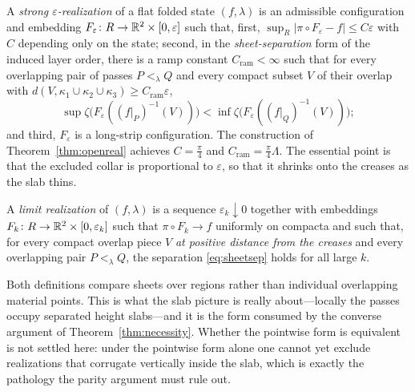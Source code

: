 \begin{definition}\label{def:strongreal}
A \emph{strong $\varepsilon$-realization} of a flat folded state $(f,\lambda)$ is an admissible configuration and embedding $F_\varepsilon\colon R\to\mathbb{R}^2\times[0,\varepsilon]$ such that, first, $\sup_R\lvert\pi\circ F_\varepsilon-f\rvert\le C\varepsilon$ with $C$ depending only on the state; second, in the \emph{sheet-separation} form of the induced layer order, there is a ramp constant $C_{\mathrm{ram}}<\infty$ such that for every overlapping pair of passes $P<_\lambda Q$ and every compact subset $V$ of their overlap with $d(V,\kappa_1\cup\kappa_2\cup\kappa_3)\ge C_{\mathrm{ram}}\varepsilon$,
\begin{equation}\label{eq:sheetsep}
  \sup\zeta\bigl(F_\varepsilon((f|_P)^{-1}(V))\bigr)<\inf\zeta\bigl(F_\varepsilon((f|_Q)^{-1}(V))\bigr);
\end{equation}
and third, $F_\varepsilon$ is a long-strip configuration. The construction of Theorem~\ref{thm:openreal} achieves $C=\frac\pi4$ and $C_{\mathrm{ram}}=\frac\pi4\Lambda$. The essential point is that the excluded collar is proportional to $\varepsilon$, so that it shrinks onto the creases as the slab thins.
\end{definition}

\begin{definition}\label{def:limitreal}
A \emph{limit realization} of $(f,\lambda)$ is a sequence $\varepsilon_k\downarrow0$ together with embeddings $F_k\colon R\to\mathbb{R}^2\times[0,\varepsilon_k]$ such that $\pi\circ F_k\to f$ uniformly on compacta and such that, for every compact overlap piece $V$ \emph{at positive distance from the creases} and every overlapping pair $P<_\lambda Q$, the separation \eqref{eq:sheetsep} holds for all large $k$.
\end{definition}

\begin{remark}\label{rem:sheetform}
Both definitions compare sheets over regions rather than individual overlapping material points. This is what the slab picture is really about---locally the passes occupy separated height slabs---and it is the form consumed by the converse argument of Theorem~\ref{thm:necessity}. Whether the pointwise form is equivalent is not settled here: under the pointwise form alone one cannot yet exclude realizations that corrugate vertically inside the slab, which is exactly the pathology the parity argument must rule out.
\end{remark}

